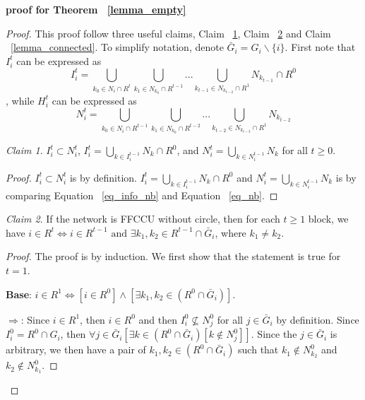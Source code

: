 \documentclass[12pt,letter]{article}
\theoremstyle{definition}
\theoremstyle{remark}
\theoremstyle{claim}
\newtheorem{claim}{Claim}
\begin{document}
\textbf{proof for Theorem ~\ref{lemma_empty}}
\begin{proof}
This proof follow three useful claims, Claim ~\ref{lemma_I_subset_N}, Claim ~\ref{lemma1} and Claim ~\ref{lemma_connected}. To simplify notation, denote $\bar{G}_i=G_i\backslash \{i\}$. First note that $I^t_i$ can be expressed as 
\begin{equation}
\label{eq_info_nb}
I^{t}_i = \bigcup_{k_0\in N_i\cap R^{t}}\bigcup_{k_1\in N_{k_0}\cap R^{t-1}}...\bigcup_{k_{t-1}\in N_{k_{t-2}}\cap R^{1}}N_{k_{t-1}}\cap R^0
\end{equation}
, while $H^t_i$ can be expressed as
\begin{equation}
\label{eq_nb}
N^t_i = \bigcup_{k_0\in N_i\cap R^{t-1}}\bigcup_{k_1\in N_{k_0}\cap R^{t-2}}...\bigcup_{k_{t-2}\in N_{k_{t-3}}\cap R^{1}}N_{k_{t-2}}
\end{equation}

\begin{claim}
\label{lemma_I_subset_N}
$I^t_i\subset N^t_i$, $I^t_i=\bigcup_{k\in I^{t-1}_i}N_k\cap R^0$, and $N^t_i=\bigcup_{k\in N^{t-1}_i}N_k$ for all $t\geq 0$.
\end{claim}
\begin{proof}
$I^t_i\subset N^t_i$ is by definition. $I^t_i=\bigcup_{k\in I^{t-1}_i}N_k\cap R^0$ and $N^t_i=\bigcup_{k\in N^{t-1}_i}N_k$ is by comparing Equation ~\ref{eq_info_nb} and Equation ~\ref{eq_nb}.
\end{proof}

\begin{claim}
\label{lemma1}
If the network is FFCCU without circle, then for each $t\geq 1$ block, we have $i\in R^t\Leftrightarrow i\in R^{t-1} \text{ and } \exists k_1,k_2\in R^{t-1}\cap \bar{G}_i$, where $k_1\neq k_2$.
\end{claim}
\begin{proof}
The proof is by induction. We first show that the statement is true for $t=1$. 

\textbf{Base}: $i\in R^1\Leftrightarrow [i\in R^0] \wedge [\exists k_1,k_2\in (R^0\cap \bar{G}_i)]$. 

$\Rightarrow$: Since $i\in R^1$, then $i\in R^0$ and then $I^0_i\nsubseteq N^0_j$ for all $j\in \bar{G}_i$ by definition. Since $I^0_i=R^0\cap G_i$, then $\forall j\in \bar{G}_i [\exists k\in (R^0\cap \bar{G}_i) [k\notin N^0_j]]$. Since the $j\in \bar{G}_i$ is arbitrary,  we then have a pair of $k_1, k_2 \in (R^0\cap \bar{G}_i)$ such that $k_1\notin N^0_{k_2}$ and $k_2\notin N^0_{k_1}$.


\end{proof}
\end{proof}
\end{document}
